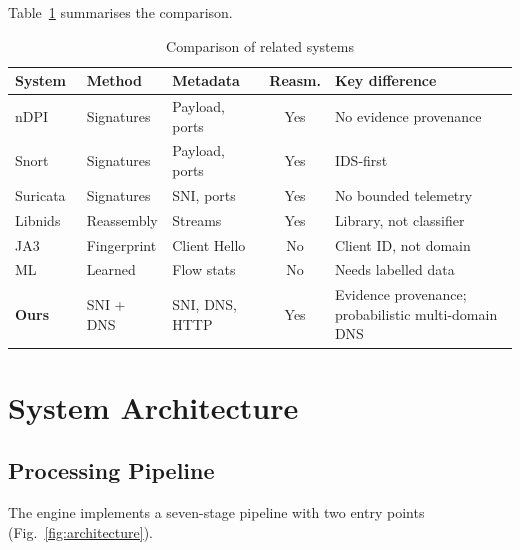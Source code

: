 \documentclass[conference]{IEEEtran}
\begin{document}
Table~\ref{tab:related} summarises the comparison.

\begin{table}[!t]
\centering
\caption{Comparison of related systems}
\label{tab:related}
\scriptsize
\begin{tabular}{|p{1.0cm}|p{1.2cm}|p{1.4cm}|c|p{1.8cm}|}
\hline
\textbf{System} & \textbf{Method} & \textbf{Metadata} & \textbf{Reasm.} & \textbf{Key difference} \\
\hline
nDPI~\cite{ndpi} & Signatures & Payload, ports & Yes & No evidence provenance \\
\hline
Snort~\cite{snort} & Signatures & Payload, ports & Yes & IDS-first \\
\hline
Suricata~\cite{suricata} & Signatures & SNI, ports & Yes & No bounded telemetry \\
\hline
Libnids~\cite{libnids} & Reassembly & Streams & Yes & Library, not classifier \\
\hline
JA3~\cite{ja3} & Fingerprint & Client Hello & No & Client ID, not domain \\
\hline
ML~\cite{rf} & Learned & Flow stats & No & Needs labelled data \\
\hline
\textbf{Ours} & SNI + DNS & SNI, DNS, HTTP & Yes & Evidence provenance; probabilistic multi-domain DNS \\
\hline
\end{tabular}
\end{table}

\section{System Architecture}

\subsection{Processing Pipeline}

The engine implements a seven-stage pipeline with two entry points
(Fig.~\ref{fig:architecture}).
\end{document}
